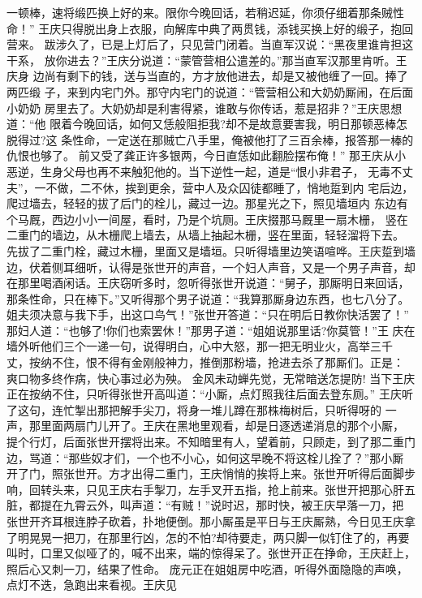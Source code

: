 一顿棒，速将缎匹换上好的来。限你今晚回话，若稍迟延，你须仔细着那条贼性命！”
王庆只得脱出身上衣服，向解库中典了两贯钱，添钱买换上好的缎子，抱回营来。
跋涉久了，已是上灯后了，只见营门闭着。当直军汉说：“黑夜里谁肯担这干系，
放你进去？”王庆分说道：“蒙管营相公遣差的。”那当直军汉那里肯听。王庆身
边尚有剩下的钱，送与当直的，方才放他进去，却是又被他缠了一回。捧了两匹缎
子，来到内宅门外。那守内宅门的说道：“管营相公和大奶奶厮闹，在后面小奶奶
房里去了。大奶奶却是利害得紧，谁敢与你传话，惹是招非？”王庆思想道：“他
限着今晚回话，如何又恁般阻拒我?却不是故意要害我，明日那顿恶棒怎脱得过?这
条性命，一定送在那贼亡八手里，俺被他打了三百余棒，报答那一棒的仇恨也够了。
前又受了龚正许多银两，今日直恁如此翻脸摆布俺！”
那王庆从小恶逆，生身父母也再不来触犯他的。当下逆性一起，道是“恨小非君子，
无毒不丈夫”，一不做，二不休，挨到更余，营中人及众囚徒都睡了，悄地踅到内
宅后边，爬过墙去，轻轻的拔了后门的栓儿，藏过一边。那星光之下，照见墙垣内
东边有个马厩，西边小小一间屋，看时，乃是个坑厕。王庆掇那马厩里一扇木栅，
竖在二重门的墙边，从木栅爬上墙去，从墙上抽起木栅，竖在里面，轻轻溜将下去。
先拔了二重门栓，藏过木栅，里面又是墙垣。只听得墙里边笑语喧哗。王庆踅到墙
边，伏着侧耳细听，认得是张世开的声音，一个妇人声音，又是一个男子声音，却
在那里喝酒闲话。王庆窃听多时，忽听得张世开说道：“舅子，那厮明日来回话，
那条性命，只在棒下。”又听得那个男子说道：“我算那厮身边东西，也七八分了。
姐夫须决意与我下手，出这口鸟气！”张世开答道：“只在明后日教你快活罢了！”
那妇人道：“也够了!你们也索罢休！”那男子道：“姐姐说那里话?你莫管！”王
庆在墙外听他们三个一递一句，说得明白，心中大怒，那一把无明业火，高举三千
丈，按纳不住，恨不得有金刚般神力，推倒那粉墙，抢进去杀了那厮们。正是：
爽口物多终作病，快心事过必为殃。
金风未动蝉先觉，无常暗送怎提防!
当下王庆正在按纳不住，只听得张世开高叫道：“小厮，点灯照我往后面去登东厕。”
王庆听了这句，连忙掣出那把解手尖刀，将身一堆儿蹲在那株梅树后，只听得呀的
一声，那里面两扇门儿开了。王庆在黑地里观看，却是日逐透递消息的那个小厮，
提个行灯，后面张世开摆将出来。不知暗里有人，望着前，只顾走，到了那二重门
边，骂道：“那些奴才们，一个也不小心，如何这早晚不将这栓儿拴了？”那小厮
开了门，照张世开。方才出得二重门，王庆悄悄的挨将上来。张世开听得后面脚步
响，回转头来，只见王庆右手掣刀，左手叉开五指，抢上前来。张世开把那心肝五
脏，都提在九霄云外，叫声道：“有贼！”说时迟，那时快，被王庆早落一刀，把
张世开齐耳根连脖子砍着，扑地便倒。那小厮虽是平日与王庆厮熟，今日见王庆拿
了明晃晃一把刀，在那里行凶，怎的不怕?却待要走，两只脚一似钉住了的，再要
叫时，口里又似哑了的，喊不出来，端的惊得呆了。张世开正在挣命，王庆赶上，
照后心又刺一刀，结果了性命。
庞元正在姐姐房中吃酒，听得外面隐隐的声唤，点灯不迭，急跑出来看视。王庆见
